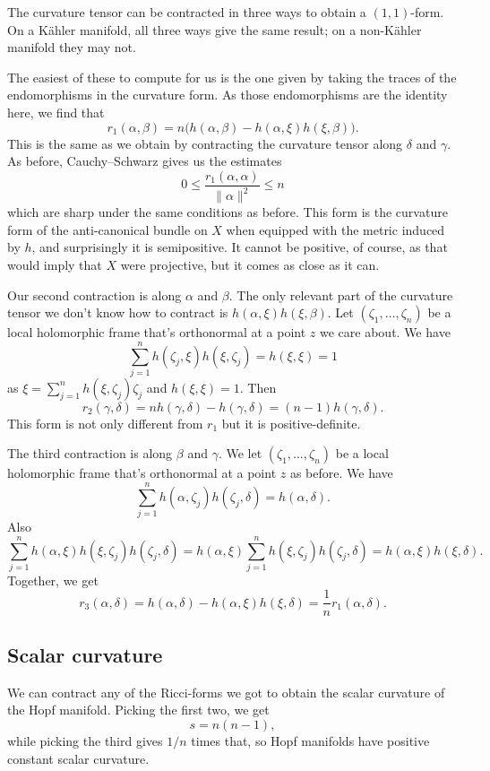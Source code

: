 \documentclass[11pt]{article}
\begin{document}
The curvature tensor can be contracted in three ways to obtain a \((1,1)\)-form. On a K\"ahler manifold, all three ways give the same result; on a non-K\"ahler manifold they may not.

The easiest of these to compute for us is the one given by taking the traces of the endomorphisms in the curvature form. As those endomorphisms are the identity here, we find that
$$
r_1(\alpha, \beta)
= n \bigl( h(\alpha, \beta) - h(\alpha, \xi) h(\xi, \beta) \bigr).
$$
This is the same as we obtain by contracting the curvature tensor along \(\delta\) and \(\gamma\). As before, Cauchy--Schwarz gives us the estimates
$$
0
\leq \frac{r_1(\alpha, \alpha)}{\|\alpha\|^2}
\leq n
$$
which are sharp under the same conditions as before. This form is the curvature form of the anti-canonical bundle on $X$ when equipped with the metric induced by $h$, and surprisingly it is semipositive. It cannot be positive, of course, as that would imply that $X$ were projective, but it comes as close as it can.

Our second contraction is along \(\alpha\) and \(\beta\). The only relevant part of the curvature tensor we don't know how to contract is \(h(\alpha, \xi)h(\xi, \beta)\). Let \((\zeta_1, \ldots, \zeta_n)\) be a local holomorphic frame that's orthonormal at a point \(z\) we care about. We have
$$
\sum_{j=1}^n h(\zeta_j, \xi) h(\xi, \zeta_j) = h(\xi, \xi) = 1
$$
as \(\xi = \sum_{j=1}^n h(\xi, \zeta_j) \zeta_j\) and \(h(\xi,\xi) = 1\).
Then
$$
r_2(\gamma, \delta)
= n h(\gamma, \delta) - h(\gamma, \delta)
= (n-1) h(\gamma, \delta).
$$
This form is not only different from \(r_1\) but it is positive-definite.

The third contraction is along \(\beta\) and \(\gamma\). We let \((\zeta_1, \ldots, \zeta_n)\) be a local holomorphic frame that's orthonormal at a point \(z\) as before. We have
$$
\sum_{j=1}^n h(\alpha, \zeta_j) h(\zeta_j, \delta)
= h(\alpha, \delta).
$$
Also
$$
\sum_{j=1}^n h(\alpha, \xi) h(\xi, \zeta_j) h(\zeta_j, \delta)
= h(\alpha, \xi) \sum_{j=1}^n  h(\xi, \zeta_j) h(\zeta_j, \delta)
= h(\alpha, \xi) h(\xi, \delta).
$$
Together, we get
$$
r_3(\alpha, \delta)
= h(\alpha, \delta) - h(\alpha, \xi) h(\xi, \delta)
= \frac{1}{n} r_1(\alpha, \delta).
$$

\subsection{Scalar curvature}
\label{sec:orgf9212d2}

We can contract any of the Ricci-forms we got to obtain the scalar curvature of the Hopf manifold. Picking the first two, we get
$$
s = n(n-1),
$$
while picking the third gives \(1/n\) times that, so Hopf manifolds have positive constant scalar curvature.
\end{document}

